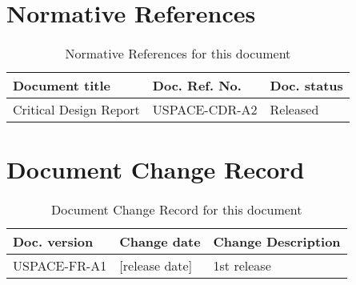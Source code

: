 \thispagestyle{plain}
\chapter*{Normative References}
%
\begin{table}[H]
\centering
\caption{Normative References for this document}
\label{tab:normative_references}
\begin{tabular}{lll}
\hline
\textbf{Document title} & \textbf{Doc. Ref. No.} & \textbf{Doc. status}\\
\hline
Critical Design Report & USPACE-CDR-A2 & Released\\
\hline
\end{tabular}
\end{table}
%
\newpage
%
\thispagestyle{plain}
\chapter*{Document Change Record}
%
%
\begin{table}[H]
\centering
\caption{Document Change Record for this document}
\label{tab:document_change_record}
\begin{tabular}{p{}p{}p{}}
\hline
\textbf{Doc. version} & \textbf{Change date} & \textbf{Change Description}\\
\hline
USPACE-FR-A1 & [release date] & 1st release\\
\hline
\end{tabular}
\end{table}